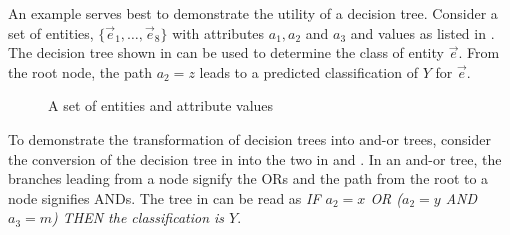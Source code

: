 \documentclass[twoside,11pt]{article}
\begin{document}
An example serves best to demonstrate the utility of a decision tree. Consider a set of entities, $\{\vec e_1,\ldots, \vec e_8\}$ with attributes $a_1,a_2$ and $a_3$ and values as listed in .  The decision tree shown in  can be used to determine the class of entity $\vec e$.  From the root node, the path $a_2 = z$ leads to a predicted classification of $Y$ for $\vec e$.  
\begin{figure} [h!]
\centering
{}
\caption{A set of entities and attribute values}
\end{figure}

To demonstrate the transformation of decision trees into and-or trees, consider the conversion of the decision tree in  into the two  in  and .  In an and-or tree, the branches leading from a node signify the ORs and the path from the root  to a node signifies ANDs.  The tree in  can be read as {\it IF $a_2 = x$ OR ($a_2 = y$ AND $a_3 = m$) THEN the classification is $Y$}.
\end{document}
